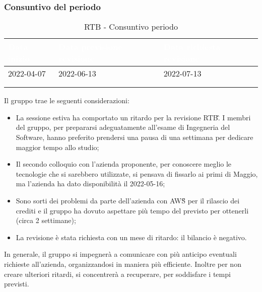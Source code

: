 {    \subsubsection{Consuntivo del periodo} {
        \setlength{\freewidth}{\dimexpr\textwidth-30\tabcolsep}
        \renewcommand{\arraystretch}{1.0}
        \setlength{\aboverulesep}{0pt}
        \setlength{\belowrulesep}{0pt}
        \begin{longtable}{C{.4\freewidth} C{.4\freewidth} C{.4\freewidth}}
        \toprule
        \textcolor{white}{\textbf{Data inizio}}&
        \textcolor{white}{\textbf{Data previsione revisione}}&
        \textcolor{white}{\textbf{Data richiesta revisione}} \\
        \toprule
        \endhead
            
        2022-04-07 & 2022-06-13 & 2022-07-13 \\
        \bottomrule
        \\
        \caption{RTB - Consuntivo periodo}
        \end{longtable}
        Il gruppo trae le seguenti considerazioni:
        \begin{itemize}
            \item La sessione estiva ha comportato un ritardo per la revisione RTB\G. I membri del gruppo,
                  per prepararsi adeguatamente all'esame di Ingegneria del Software, 
                  hanno preferito prendersi una pausa di una settimana per dedicare maggior tempo allo studio;
            \item Il secondo colloquio con l'azienda proponente, per conoscere meglio le tecnologie che si sarebbero 
                  utilizzate, si pensava di fissarlo ai primi di Maggio, ma l'azienda ha dato disponibilità 
                  il 2022-05-16;
            \item Sono sorti dei problemi da parte dell'azienda con AWS\G{} per il rilascio dei crediti e il gruppo ha dovuto aspettare 
                  più tempo del previsto per ottenerli (circa 2 settimane);
            \item La revisione è stata richiesta con un mese di ritardo: il bilancio è negativo.
        \end{itemize}
        In generale, il gruppo si impegnerà a comunicare con più anticipo eventuali richieste all'azienda, organizzandosi 
        in maniera più efficiente. Inoltre per non creare ulteriori ritardi, si concentrerà a recuperare, per soddisfare i tempi previsti. 
    }
 }

